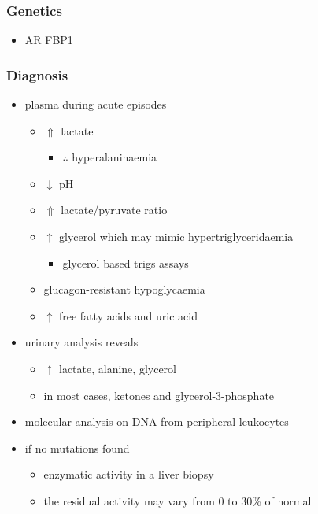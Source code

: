 \documentclass[12pt]{scrartcl}
\begin{document}
\subsubsection{Genetics}
\label{sec:org8f80749}
\begin{itemize}
\item AR FBP1
\end{itemize}

\subsubsection{Diagnosis}
\label{sec:org69fd497}
\begin{itemize}
\item plasma during acute episodes
\begin{itemize}
\item \(\Uparrow\) lactate
\begin{itemize}
\item \(\therefore\) hyperalaninaemia
\end{itemize}
\item \(\downarrow\) pH
\item \(\Uparrow\) lactate/pyruvate ratio
\item \(\uparrow\) glycerol which may mimic hypertriglyceridaemia
\begin{itemize}
\item glycerol based trigs assays
\end{itemize}
\item glucagon-resistant hypoglycaemia
\item \(\uparrow\) free fatty acids and uric acid
\end{itemize}
\item urinary analysis reveals
\begin{itemize}
\item \(\uparrow\) lactate, alanine, glycerol
\item in most cases, ketones and glycerol-3-phosphate
\end{itemize}

\item molecular analysis on DNA from peripheral leukocytes
\item if no mutations found
\begin{itemize}
\item enzymatic activity in a liver biopsy
\item the residual activity may vary from 0 to 30\% of normal
\end{itemize}
\end{itemize}
\end{document}
